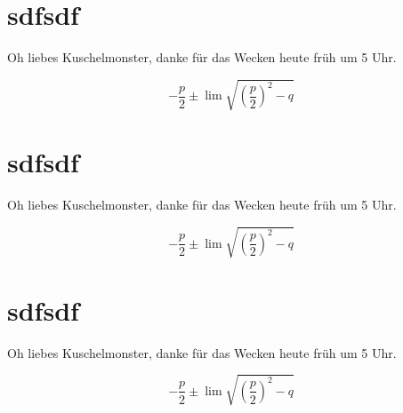 \documentclass[12pt,ngerman]{article}
\begin{document}
\section{sdfsdf}

Oh liebes Kuschelmonster, danke für das Wecken heute früh um 5 Uhr.

\[
- \frac{p}{2} \pm \lim \sqrt{ \left( \frac{p}{2}\right)^2 -q  }
\]


\courgette
\section{sdfsdf}

Oh liebes Kuschelmonster, danke für das Wecken heute früh um 5 Uhr.

\[
- \frac{p}{2} \pm \lim \sqrt{ \left( \frac{p}{2}\right)^2 -q  }
\]

\hand
\section{sdfsdf}

Oh liebes Kuschelmonster, danke für das Wecken heute früh um 5 Uhr.

\[
- \frac{p}{2} \pm \lim \sqrt{ \left( \frac{p}{2}\right)^2 -q  }
\]

\ms \blindtext
\end{document}
